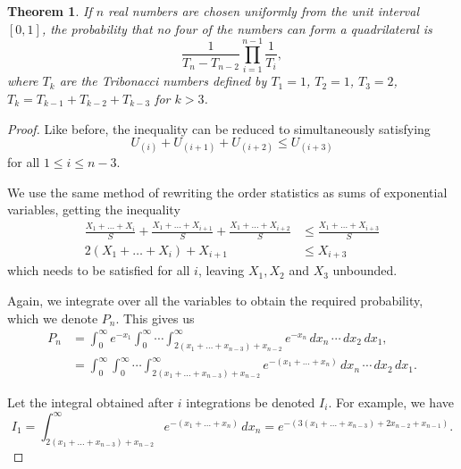 \documentclass{amsart}
\newtheorem{theorem}{Theorem}
\begin{document}
\begin{theorem}
  If \(n\) real numbers are chosen uniformly from the unit interval \([0, 1]\), the probability that no four of the numbers can form a quadrilateral is \[
    \frac{1}{T_n - T_{n-2}} \prod_{i = 1}^{n-1} \frac{1}{T_i}
  ,\] where \(T_k\) are the \emph{Tribonacci} numbers defined by \(T_1 = 1\), \(T_2 = 1\), \(T_3 = 2\), \(T_{k} = T_{k-1} + T_{k-2} + T_{k-3}\) for \(k > 3\).
\end{theorem}
\begin{proof}
  Like before, the inequality can be reduced to simultaneously satisfying \[
    U_{(i)} + U_{(i+1)} + U_{(i+2)} \le U_{(i+3)}
  \] for all $1 \le i \le n-3$.

  We use the same method of rewriting the order statistics as sums of exponential variables, getting the inequality
  \begin{align*}
    \frac{X_1 + \dots + X_{i}}{S} + \frac{X_1 + \dots + X_{i+1}}{S} + \frac{X_1 + \dots + X_{i+2}}{S} &\le \frac{X_1 + \dots + X_{i+3}}{S} \\
    2(X_1 + \dots + X_i) + X_{i+1} &\le X_{i+3}
  \end{align*}
  which needs to be satisfied for all $i$, leaving $X_1, X_2$ and $X_3$ unbounded.

  Again, we integrate over all the variables to obtain the required probability, which we denote $P_n$. This gives us
  \begin{align*}
    P_n &= \int_{0}^{\infty} e^{-x_1}\int_{0}^{\infty} \dotsi \int_{2(x_1 + \dots + x_{n-3}) + x_{n-2}}^{\infty} e^{-x_n}\, dx_n\, \cdots\, dx_2\, dx_1, \\
        &= \int_{0}^{\infty} \int_{0}^{\infty} \dotsi \int_{2(x_1 + \dots + x_{n-3}) + x_{n-2}}^{\infty} e^{-(x_1 + \dots + x_n)}\, dx_n \, \cdots \, dx_2 \, dx_1.
  \end{align*}

  Let the integral obtained after $i$ integrations be denoted $I_i$. For example, we have \[
    I_1 = \int_{2(x_1+\dots+x_{n-3})+x_{n-2}}^{\infty} e^{-(x_1+\dots+x_n)}\, dx_n = e^{-(3(x_1+\dots+x_{n-3})+2x_{n-2}+x_{n-1})}
  .\]


\end{proof}
\end{document}
